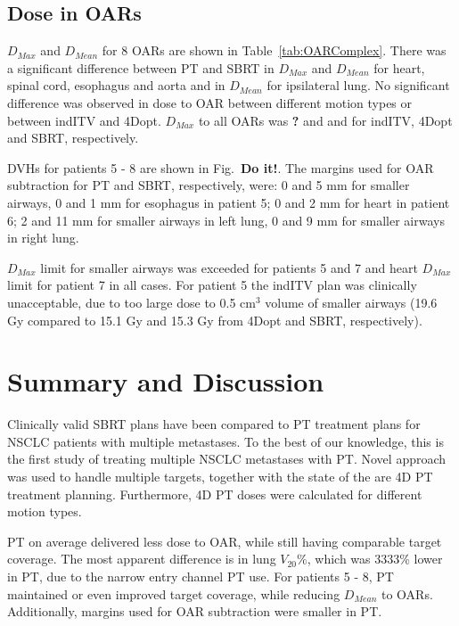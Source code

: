 \documentclass[type=dr, dr=rernat, accentcolor=tud7b,colorbacktitle, bigchapter, openright, twoside, 12pt ]{tudthesis}
\begin{document}


\subsection{Dose in OARs}

$D_{Max}$ and $D_{Mean}$ for 8 OARs are shown in Table~\ref{tab:OARComplex}. There was a significant difference between PT and SBRT in $D_{Max}$ and $D_{Mean}$ for heart, spinal cord, esophagus and aorta and in $D_{Mean}$ for ipsilateral lung.
No significant difference was observed in dose to OAR between different motion types or between indITV and 4Dopt. $D_{Max}$ to all OARs was \textbf{?} and and for indITV, 4Dopt and SBRT, respectively.

DVHs for patients 5 - 8 are shown in Fig.~\textbf{Do it!}. The margins used for OAR subtraction for PT and SBRT, respectively, were:
0 and 5 mm for smaller airways, 0 and 1 mm for esophagus in patient 5; 
0 and 2 mm for heart in patient 6; 
2 and 11 mm for smaller airways in left lung, 0 and 9 mm for smaller airways in right lung.

$D_{Max}$ limit for smaller airways was exceeded for patients 5 and 7 and heart $D_{Max}$ limit for patient 7 in all cases. For patient 5 the indITV plan was clinically unacceptable, 
due to too large dose to 0.5 cm$^3$ volume of smaller airways (19.6 Gy compared to 15.1 Gy and 15.3 Gy from 4Dopt and SBRT, respectively).





\section{Summary and Discussion}

Clinically valid SBRT plans have been compared to PT treatment plans for NSCLC patients with multiple metastases. 
To the best of our knowledge, this is the first study of treating multiple NSCLC metastases with PT. Novel approach was used to handle multiple targets, together
with the state of the are 4D PT treatment planning. Furthermore, 4D PT doses were calculated for different motion types. 

PT on average delivered less dose to OAR, while still having comparable target coverage.
The most apparent difference is in lung $V{_20\%}$, which was 3333\% lower in PT, due to the narrow entry channel PT use.
For patients 5 - 8, PT maintained or even improved target coverage, while reducing $D_{Mean}$ to OARs. Additionally,  margins used for OAR subtraction were smaller in PT.
\end{document}
